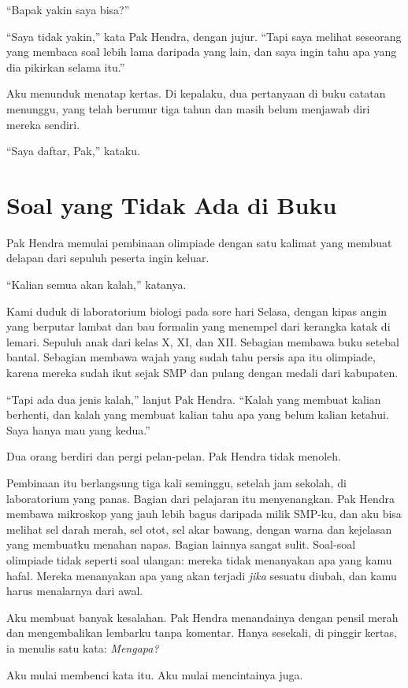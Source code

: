 \documentclass[11pt,twoside,openany]{book}
\begin{document}
``Bapak yakin saya bisa?''

``Saya tidak yakin,'' kata Pak Hendra, dengan jujur. ``Tapi saya melihat seseorang yang membaca soal lebih lama daripada yang lain, dan saya ingin tahu apa yang dia pikirkan selama itu.''

Aku menunduk menatap kertas. Di kepalaku, dua pertanyaan di buku catatan menunggu, yang telah berumur tiga tahun dan masih belum menjawab diri mereka sendiri.

``Saya daftar, Pak,'' kataku.

\chapter{Soal yang Tidak Ada di Buku}
Pak Hendra memulai pembinaan olimpiade dengan satu kalimat yang membuat delapan dari sepuluh peserta ingin keluar.

``Kalian semua akan kalah,'' katanya.

Kami duduk di laboratorium biologi pada sore hari Selasa, dengan kipas angin yang berputar lambat dan bau formalin yang menempel dari kerangka katak di lemari. Sepuluh anak dari kelas X, XI, dan XII. Sebagian membawa buku setebal bantal. Sebagian membawa wajah yang sudah tahu persis apa itu olimpiade, karena mereka sudah ikut sejak SMP dan pulang dengan medali dari kabupaten.

``Tapi ada dua jenis kalah,'' lanjut Pak Hendra. ``Kalah yang membuat kalian berhenti, dan kalah yang membuat kalian tahu apa yang belum kalian ketahui. Saya hanya mau yang kedua.''

Dua orang berdiri dan pergi pelan-pelan. Pak Hendra tidak menoleh.

Pembinaan itu berlangsung tiga kali seminggu, setelah jam sekolah, di laboratorium yang panas. Bagian dari pelajaran itu menyenangkan. Pak Hendra membawa mikroskop yang jauh lebih bagus daripada milik SMP-ku, dan aku bisa melihat sel darah merah, sel otot, sel akar bawang, dengan warna dan kejelasan yang membuatku menahan napas. Bagian lainnya sangat sulit. Soal-soal olimpiade tidak seperti soal ulangan: mereka tidak menanyakan apa yang kamu hafal. Mereka menanyakan apa yang akan terjadi \emph{jika} sesuatu diubah, dan kamu harus menalarnya dari awal.

Aku membuat banyak kesalahan. Pak Hendra menandainya dengan pensil merah dan mengembalikan lembarku tanpa komentar. Hanya sesekali, di pinggir kertas, ia menulis satu kata: \emph{Mengapa?}

Aku mulai membenci kata itu. Aku mulai mencintainya juga.
\end{document}
